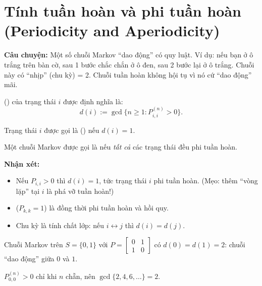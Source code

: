 \section{Tính tuần hoàn và phi tuần hoàn (Periodicity and Aperiodicity)}
\label{sec:periodicity}

\textbf{Câu chuyện:} Một số chuỗi Markov ``dao động'' có quy luật. Ví dụ: nếu bạn ở ô trắng trên bàn cờ,
sau 1 bước chắc chắn ở ô đen, sau 2 bước lại ở ô trắng. Chuỗi này có ``nhịp'' (chu kỳ) = 2.
Chuỗi tuần hoàn không hội tụ vì nó cứ ``dao động'' mãi.

\begin{dinhnghia}
 () của trạng thái $i$ được định nghĩa là:
\begin{equation}\label{eq:period}
  d(i) := \gcd\{n \geq 1 : P_{i,i}^{(n)} > 0\}.
\end{equation}
\end{dinhnghia}

\begin{dinhnghia}
Trạng thái $i$ được gọi là  () nếu $d(i) = 1$.

Một chuỗi Markov được gọi là  nếu \emph{tất cả} các trạng thái đều phi tuần hoàn.
\end{dinhnghia}

\textbf{Nhận xét:}
\begin{itemize}[nosep]
  \item Nếu $P_{i,i} > 0$ thì $d(i) = 1$, tức trạng thái $i$ phi tuần hoàn.
        (Mẹo: thêm ``vòng lặp'' tại $i$ là phá vỡ tuần hoàn!)
  \item {} ($P_{k,k} = 1$) là đồng thời phi tuần hoàn và hồi quy.
  \item Chu kỳ là tính chất lớp: nếu $i \leftrightarrow j$ thì $d(i) = d(j)$.
\end{itemize}

\begin{example}
Chuỗi Markov trên $S = \{0, 1\}$ với $P = \begin{bmatrix} 0 & 1 \\ 1 & 0 \end{bmatrix}$
có $d(0) = d(1) = 2$: chuỗi ``dao động'' giữa $0$ và $1$.

$P_{0,0}^{(n)} > 0$ chỉ khi $n$ chẵn, nên $\gcd\{2, 4, 6, \ldots\} = 2$.
\end{example}

